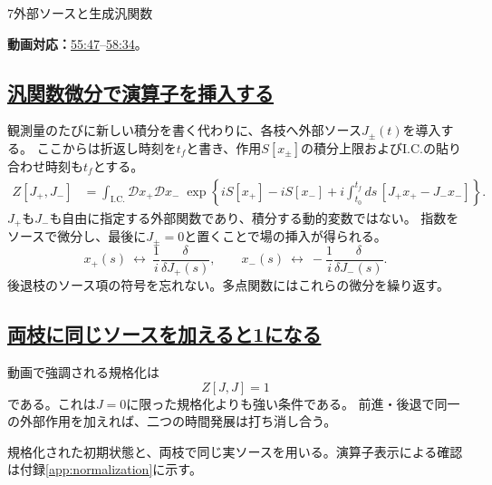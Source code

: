 \documentclass[a4paper,11pt]{ltjsarticle}
\newcommand{\subsectionlink}[1]{\subsection[#1]{\hyperlink{toc}{#1}}}
\numberwithin{equation}{section}
\newcommand{\video}[2]{\href{https://www.youtube.com/watch?v=RYxzcUhIHjk\&t=#1s}{#2}}
\newcommand{\videosource}[1]{\par\noindent\textcolor{noteblue}{\textbf{動画対応：}#1}\par\smallskip}
\begin{document}
\begin{lecturesection}{7}{外部ソースと生成汎関数}
\label{sec:sources}
\videosource{\video{3347}{55:47}--\video{3514}{58:34}。}
\subsectionlink{汎関数微分で演算子を挿入する}
観測量のたびに新しい積分を書く代わりに、各枝へ外部ソース$J_\pm(t)$を導入する。
ここからは折返し時刻を$t_f$と書き、作用$S[x_\pm]$の積分上限およびI.C.の貼り合わせ時刻も$t_f$とする。
\begin{align}
 Z[J_+,J_-]
 &=\int_{\mathrm{I.C.}}\mathcal D x_+\mathcal D x_-\;
 \exp\left\{iS[x_+]-iS[x_-]
     +i\int_{t_0}^{t_f}ds\,[J_+x_+-J_-x_-]\right\}.
 \label{eq:Z}
\end{align}
$J_+$も$J_-$も自由に指定する外部関数であり、積分する動的変数ではない。
指数をソースで微分し、最後に$J_\pm=0$と置くことで場の挿入が得られる。
\begin{equation}
 x_+(s)\ \longleftrightarrow\ \frac1i\frac\delta{\delta J_+(s)},
 \qquad
 x_-(s)\ \longleftrightarrow\ -\frac1i\frac\delta{\delta J_-(s)}.
\end{equation}
後退枝のソース項の符号を忘れない。多点関数にはこれらの微分を繰り返す。

\subsectionlink{両枝に同じソースを加えると1になる}
動画で強調される規格化は
\begin{equation}Z[J,J]=1\label{eq:ZZ}
\end{equation}
である。これは$J=0$に限った規格化よりも強い条件である。
前進・後退で同一の外部作用を加えれば、二つの時間発展は打ち消し合う。

規格化された初期状態と、両枝で同じ実ソースを用いる。演算子表示による確認は付録\ref{app:normalization}に示す。

\end{lecturesection}
\end{document}
